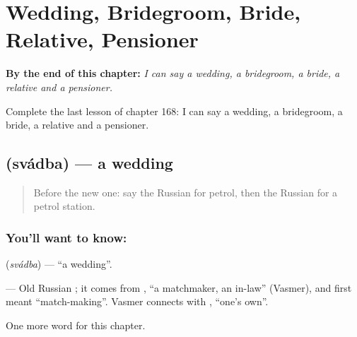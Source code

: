
\chapter{Wedding, Bridegroom, Bride, Relative, Pensioner}
\label{ch:ru-wedding-bridegroom-bride-relative-pensioner}

\begin{chapteropening}
\textbf{By the end of this chapter:} \emph{I can say a wedding, a bridegroom, a bride, a relative and a pensioner.}

Complete the last lesson of chapter 168: I can say a wedding, a bridegroom, a bride, a relative and a pensioner.
\end{chapteropening}

\section[\texorpdfstring{\ru{свадьба} (svádba)}{свадьба (svádba)}]{ (svádba) — a wedding}

\label{lesson:RU-C168-svadba}



\begin{quote}
Before the new one: say the Russian for petrol, then the Russian for a petrol station.
\end{quote}

\subsection*{You'll want to know: }
\textbf{} (\emph{svádba}) — \textquotedblleft{}a wedding\textquotedblright{}.

\begin{cousinweb}
\textbf{} — Old Russian \emph{}; it comes from \emph{}, \textquotedblleft{}a matchmaker, an in-law\textquotedblright{} (Vasmer), and first meant \textquotedblleft{}match-making\textquotedblright{}. Vasmer connects \emph{} with \emph{}, \textquotedblleft{}one's own\textquotedblright{}.
\end{cousinweb}

\begin{grammarlens}[title={What you've built}]
One more word for this chapter.
\end{grammarlens}

